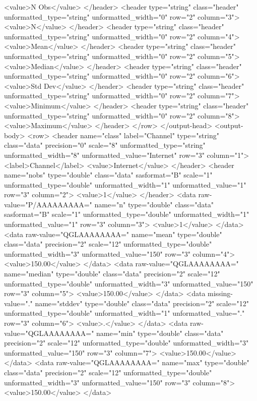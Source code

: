 <value>N Obs</value>
</header>
<header type="string" class="header" unformatted_type="string" unformatted_width="0" row="2" column="3">
<value>N</value>
</header>
<header type="string" class="header" unformatted_type="string" unformatted_width="0" row="2" column="4">
<value>Mean</value>
</header>
<header type="string" class="header" unformatted_type="string" unformatted_width="0" row="2" column="5">
<value>Median</value>
</header>
<header type="string" class="header" unformatted_type="string" unformatted_width="0" row="2" column="6">
<value>Std Dev</value>
</header>
<header type="string" class="header" unformatted_type="string" unformatted_width="0" row="2" column="7">
<value>Minimum</value>
</header>
<header type="string" class="header" unformatted_type="string" unformatted_width="0" row="2" column="8">
<value>Maximum</value>
</header>
</row>
</output-head>
<output-body>
<row>
<header name="class" label="Channel" type="string" class="data" precision="0" scale="8" unformatted_type="string" unformatted_width="8" unformatted_value="Internet" row="3" column="1">
<label>Channel</label>
<value>Internet</value>
</header>
<header name="nobs" type="double" class="data" sasformat="B" scale="1" unformatted_type="double" unformatted_width="1" unformatted_value="1" row="3" column="2">
<value>1</value>
</header>
<data raw-value="P/AAAAAAAAA=" name="n" type="double" class="data" sasformat="B" scale="1" unformatted_type="double" unformatted_width="1" unformatted_value="1" row="3" column="3">
<value>1</value>
</data>
<data raw-value="QGLAAAAAAAA=" name="mean" type="double" class="data" precision="2" scale="12" unformatted_type="double" unformatted_width="3" unformatted_value="150" row="3" column="4">
<value>150.00</value>
</data>
<data raw-value="QGLAAAAAAAA=" name="median" type="double" class="data" precision="2" scale="12" unformatted_type="double" unformatted_width="3" unformatted_value="150" row="3" column="5">
<value>150.00</value>
</data>
<data missing-value="." name="stddev" type="double" class="data" precision="2" scale="12" unformatted_type="double" unformatted_width="1" unformatted_value="." row="3" column="6">
<value>.</value>
</data>
<data raw-value="QGLAAAAAAAA=" name="min" type="double" class="data" precision="2" scale="12" unformatted_type="double" unformatted_width="3" unformatted_value="150" row="3" column="7">
<value>150.00</value>
</data>
<data raw-value="QGLAAAAAAAA=" name="max" type="double" class="data" precision="2" scale="12" unformatted_type="double" unformatted_width="3" unformatted_value="150" row="3" column="8">
<value>150.00</value>
</data>
